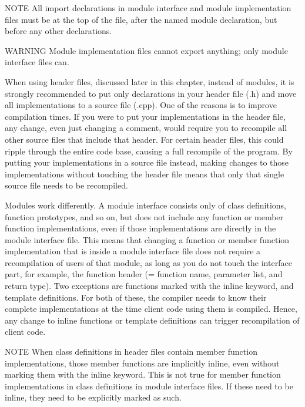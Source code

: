 \begin{myNotic}{NOTE}
All import declarations in module interface and module implementation files must be at the top of the file, after the named module declaration, but before any other declarations.
\end{myNotic}

\begin{myWarning}{WARNING}
Module implementation files cannot export anything; only module interface files can.
\end{myWarning}


When using header files, discussed later in this chapter, instead of modules, it is strongly recommended to put only declarations in your header file (.h) and move all implementations to a source file (.cpp). One of the reasons is to improve compilation times. If you were to put your implementations in the header file, any change, even just changing a comment, would require you to recompile all other source files that include that header. For certain header files, this could ripple through the entire code base, causing a full recompile of the program. By putting your implementations in a source file instead, making changes to those implementations without touching the header file means that only that single source file needs to be recompiled.

Modules work differently. A module interface consists only of class definitions, function prototypes, and so on, but does not include any function or member function implementations, even if those implementations are directly in the module interface file. This means that changing a function or member function implementation that is inside a module interface file does not require a recompilation of users of that module, as long as you do not touch the interface part, for example, the function header (= function name, parameter list, and return type). Two exceptions are functions marked with the inline keyword, and template definitions. For both of these, the compiler needs to know their complete implementations at the time client code using them is compiled. Hence, any change to inline functions or template definitions can trigger recompilation of client code.

\begin{myNotic}{NOTE}
When class definitions in header files contain member function implementations, those member functions are implicitly inline, even without marking them with the inline keyword. This is not true for member function implementations in class definitions in module interface files. If these need to be inline, they need to be explicitly marked as such.
\end{myNotic}

